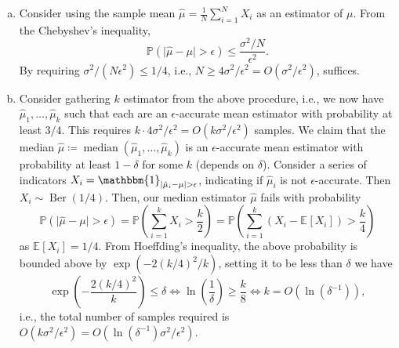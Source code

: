 \begin{answer}
	\begin{enumerate}[(a)]
		\item Consider using the sample mean \(\hat{\mu} = \frac{1}{N} \sum_{i=1}^{N} X_i\) as an estimator of \(\mu \). From the Chebyshev's inequality,
		      \[
			      \mathbb{P} \left( \vert \hat{\mu} - \mu \vert > \epsilon \right)
			      \leq \frac{\sigma ^2 / N}{\epsilon ^2}.
		      \]
		      By requiring \(\sigma ^2 / (N\epsilon ^2) \leq 1 / 4\), i.e., \(N \geq 4\sigma ^2 / \epsilon ^2 = O(\sigma ^2 / \epsilon ^2)\), suffices.
		\item Consider gathering \(k\) estimator from the above procedure, i.e., we now have \(\hat{\mu} _1, \dots , \hat{\mu} _k\) such that each are an \(\epsilon \)-accurate mean estimator with probability at least \(3 / 4\). This requires \(k \cdot 4 \sigma ^2 / \epsilon ^2 = O(k \sigma ^2 / \epsilon ^2)\) samples. We claim that the median \(\hat{\mu} \coloneqq \operatorname{median}(\hat{\mu} _1, \dots , \hat{\mu} _k) \) is an \(\epsilon \)-accurate mean estimator with probability at least \(1 - \delta \) for some \(k\) (depends on \(\delta \)). Consider a series of indicators \(X_i = \mathbbm{1}_{\vert \hat{\mu} _i - \mu \vert > \epsilon } \), indicating if \(\hat{\mu} _i\) is not \(\epsilon \)-accurate. Then \(X_i \sim \operatorname{Ber}(1 / 4) \). Then, our median estimator \(\hat{\mu} \) fails with probability
		      \[
			      \mathbb{P} \left( \vert \hat{\mu} - \mu  \vert > \epsilon \right)
			      = \mathbb{P} \left( \sum_{i=1}^{k} X_i > \frac{k}{2} \right)
			      = \mathbb{P} \left( \sum_{i=1}^{k} (X_i - \mathbb{E}_{}\left[X_i \right] ) > \frac{k}{4} \right)
		      \]
		      as \(\mathbb{E}_{}\left[X_i \right] = 1 / 4\). From Hoeffding's inequality, the above probability is bounded above by \(\exp (- 2 (k / 4)^2 / k)\), setting it to be less than \(\delta \) we have
		      \[
			      \exp (- \frac{2 (k / 4)^2}{k}) \leq \delta
			      \iff \ln \left( \frac{1}{\delta } \right) \geq \frac{k}{8}
			      \iff k = O(\ln (\delta ^{-1} )),
		      \]
		      i.e., the total number of samples required is \(O(k \sigma ^2 / \epsilon ^2) = O(\ln (\delta ^{-1} ) \sigma ^2 / \epsilon ^2)\).
	\end{enumerate}
\end{answer}

